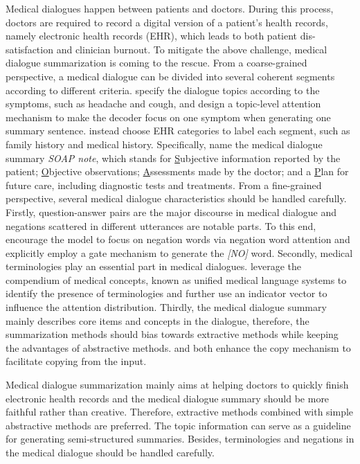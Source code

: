 \label{sec:medical}
Medical dialogues happen between patients and doctors. During this process, doctors are required to record a digital version of a patient’s health records, namely electronic health records (EHR), which leads to both patient dis-satisfaction and clinician burnout.
To mitigate the above challenge, medical dialogue summarization is coming to the rescue. 
From a coarse-grained perspective, a medical dialogue can be divided into several coherent segments according to different criteria.
 specify the dialogue topics according to the symptoms, such as headache and cough, and design a topic-level attention mechanism to make the decoder focus on one symptom when generating one summary sentence.
 instead choose EHR categories to label each segment, such as family history and medical history.
Specifically,  name the medical dialogue summary {\it SOAP note}, which stands for \underline{S}ubjective information reported by the patient; \underline{O}bjective observations; \underline{A}ssessments made by the doctor; and a \underline{P}lan for future care, including diagnostic tests and treatments. 
From a fine-grained perspective, several medical dialogue characteristics should be handled carefully.
Firstly, question-answer pairs are the major discourse in medical dialogue and negations scattered in different utterances are notable parts. 
To this end,  encourage the model to focus on negation words via negation word attention and explicitly employ a gate mechanism to generate the \textit{[NO]} word.
Secondly, medical terminologies play an essential part in medical dialogues.
 leverage the compendium of medical concepts, known as unified medical language systems to identify the presence of terminologies and further use an indicator vector to influence the attention distribution.
Thirdly, the medical dialogue summary mainly describes core items and concepts in the dialogue, therefore, the summarization methods should bias towards extractive methods while keeping the advantages of abstractive methods.  and  both enhance the copy mechanism to facilitate copying from the input.

Medical dialogue summarization mainly aims at helping doctors to quickly finish electronic health records and the medical dialogue summary should be more faithful rather than creative. Therefore, extractive methods combined with simple abstractive methods are preferred. 
The topic information can serve as a guideline for generating semi-structured summaries.
Besides, terminologies and negations in the medical dialogue should be handled carefully.

